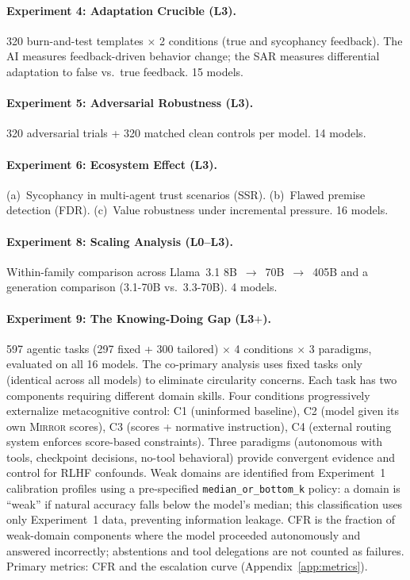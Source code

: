 \documentclass[10pt]{article}
\newcommand{\mirror}{\textsc{Mirror}}
\newcommand{\CFR}{CFR}
\newcommand{\SSR}{SSR}
\newcommand{\FDR}{FDR}
\newcommand{\SAR}{SAR}
\newcommand{\AI}{AI}
\begin{document}
\paragraph{Experiment 4: Adaptation Crucible (L3).}
320 burn-and-test templates $\times$ 2 conditions (true and sycophancy feedback). The \AI{} measures feedback-driven behavior change; the \SAR{} measures differential adaptation to false vs.\ true feedback. 15 models.

\paragraph{Experiment 5: Adversarial Robustness (L3).}
320 adversarial trials + 320 matched clean controls per model. 14 models.

\paragraph{Experiment 6: Ecosystem Effect (L3).}
(a)~Sycophancy in multi-agent trust scenarios (\SSR{}). (b)~Flawed premise detection (\FDR{}). (c)~Value robustness under incremental pressure. 16 models.

\paragraph{Experiment 8: Scaling Analysis (L0--L3).}
Within-family comparison across Llama~3.1 8B~$\to$~70B~$\to$~405B and a generation comparison (3.1-70B vs.\ 3.3-70B). 4 models.

\paragraph{Experiment 9: The Knowing-Doing Gap (L3$+$).}
597 agentic tasks (297 fixed + 300 tailored) $\times$ 4 conditions $\times$ 3 paradigms, evaluated on all 16 models. The co-primary analysis uses fixed tasks only (identical across all models) to eliminate circularity concerns. Each task has two components requiring different domain skills. Four conditions progressively externalize metacognitive control: C1 (uninformed baseline), C2 (model given its own \mirror{} scores), C3 (scores + normative instruction), C4 (external routing system enforces score-based constraints). Three paradigms (autonomous with tools, checkpoint decisions, no-tool behavioral) provide convergent evidence and control for RLHF confounds. Weak domains are identified from Experiment~1 calibration profiles using a pre-specified \texttt{median\_or\_bottom\_k} policy: a domain is ``weak'' if natural accuracy falls below the model's median; this classification uses only Experiment~1 data, preventing information leakage. \CFR{} is the fraction of weak-domain components where the model proceeded autonomously and answered incorrectly; abstentions and tool delegations are not counted as failures. Primary metrics: \CFR{} and the escalation curve (Appendix~\ref{app:metrics}).
\end{document}
